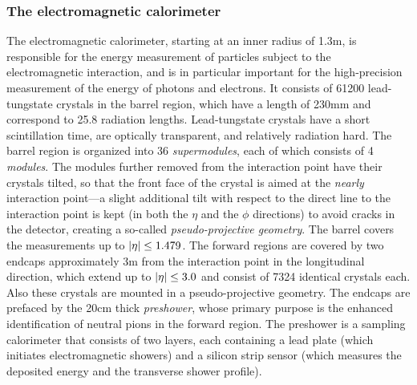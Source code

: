 \subsubsection{The electromagnetic calorimeter}
\label{sec:ecal}

The electromagnetic calorimeter, starting at an inner radius of 1.3\unit{m}, is responsible for the energy measurement of particles subject to the electromagnetic interaction, and is in particular important for the high-precision measurement of the energy of photons and electrons.
% 
It consists of 61200 lead-tungstate crystals in the barrel region, which have a length of 230\unit{mm} and correspond to 25.8 radiation lengths.
% 
Lead-tungstate crystals have a short scintillation time, are optically transparent, and relatively radiation hard.
% 
The barrel region is organized into 36 \textit{supermodules}, each of which consists of 4 \textit{modules}.
% 
The modules further removed from the interaction point have their crystals tilted, so that the front face of the crystal is aimed at the \textit{nearly} interaction point---a slight additional tilt with respect to the direct line to the interaction point is kept (in both the $\eta$ and the $\phi$ directions) to avoid cracks in the detector, creating a so-called \textit{pseudo-projective geometry}.
% 
The barrel covers the measurements up to $\left| \eta \right | \leq 1.479$.
% 
The forward regions are covered by two endcaps approximately 3\unit{m} from the interaction point in the longitudinal direction, which extend up to $\left| \eta \right | \leq 3.0$ and consist of 7324 identical crystals each.
% 
Also these crystals are mounted in a pseudo-projective geometry.
% 
% 
The endcaps are prefaced by the 20\unit{cm} thick \textit{preshower}, whose primary purpose is the enhanced identification of neutral pions in the forward region.
% 
The preshower is a sampling calorimeter that consists of two layers, each containing a lead plate (which initiates electromagnetic showers) and a silicon strip sensor (which measures the deposited energy and the transverse shower profile).


